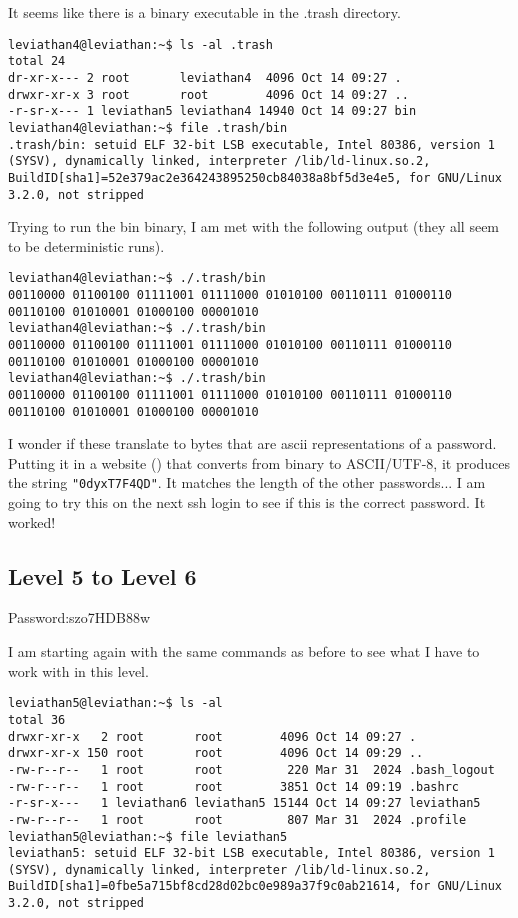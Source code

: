 \documentclass[11pt]{article}
\begin{document}
It seems like there is a binary executable in the .trash directory.
\begin{lstlisting}
leviathan4@leviathan:~$ ls -al .trash
total 24
dr-xr-x--- 2 root       leviathan4  4096 Oct 14 09:27 .
drwxr-xr-x 3 root       root        4096 Oct 14 09:27 ..
-r-sr-x--- 1 leviathan5 leviathan4 14940 Oct 14 09:27 bin
leviathan4@leviathan:~$ file .trash/bin
.trash/bin: setuid ELF 32-bit LSB executable, Intel 80386, version 1 (SYSV), dynamically linked, interpreter /lib/ld-linux.so.2, BuildID[sha1]=52e379ac2e364243895250cb84038a8bf5d3e4e5, for GNU/Linux 3.2.0, not stripped
\end{lstlisting}

Trying to run the bin binary, I am met with the following output (they all seem to be deterministic runs).
\begin{lstlisting}
leviathan4@leviathan:~$ ./.trash/bin
00110000 01100100 01111001 01111000 01010100 00110111 01000110 00110100 01010001 01000100 00001010
leviathan4@leviathan:~$ ./.trash/bin
00110000 01100100 01111001 01111000 01010100 00110111 01000110 00110100 01010001 01000100 00001010
leviathan4@leviathan:~$ ./.trash/bin
00110000 01100100 01111001 01111000 01010100 00110111 01000110 00110100 01010001 01000100 00001010
\end{lstlisting}

I wonder if these translate to bytes that are ascii representations of a password. Putting it in a website () that converts from binary to ASCII/UTF-8, it produces the string \verb|"0dyxT7F4QD"|. It matches the length of the other passwords... I am going to try this on the next ssh login to see if this is the correct password. It worked!

\subsection*{Level 5 to Level 6}
Password:szo7HDB88w

I am starting again with the same commands as before to see what I have to work with in this level. 
\begin{lstlisting}
leviathan5@leviathan:~$ ls -al
total 36
drwxr-xr-x   2 root       root        4096 Oct 14 09:27 .
drwxr-xr-x 150 root       root        4096 Oct 14 09:29 ..
-rw-r--r--   1 root       root         220 Mar 31  2024 .bash_logout
-rw-r--r--   1 root       root        3851 Oct 14 09:19 .bashrc
-r-sr-x---   1 leviathan6 leviathan5 15144 Oct 14 09:27 leviathan5
-rw-r--r--   1 root       root         807 Mar 31  2024 .profile
leviathan5@leviathan:~$ file leviathan5
leviathan5: setuid ELF 32-bit LSB executable, Intel 80386, version 1 (SYSV), dynamically linked, interpreter /lib/ld-linux.so.2, BuildID[sha1]=0fbe5a715bf8cd28d02bc0e989a37f9c0ab21614, for GNU/Linux 3.2.0, not stripped
\end{lstlisting}
\end{document}
